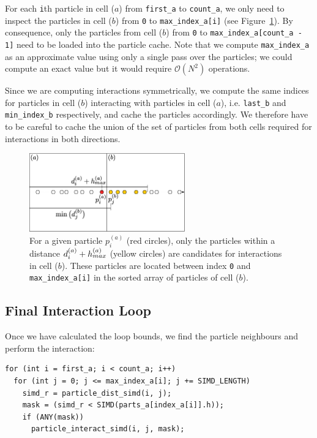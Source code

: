 \documentclass{IOS-Book-Article}
\begin{document}
\noindent For each {\tt i}th particle in cell ($a$) from {\tt first\_a} to {\tt count\_a}, we only need to inspect the particles in cell ($b$) from {\tt 0} to {\tt max\_index\_a[i]} (see Figure~\ref{fig:read_cache_subset}). By consequence, only the particles from cell ($b$) from {\tt 0} to {\tt max\_index\_a[count\_a - 1]} need to be loaded into the particle cache. Note that we compute {\tt max\_index\_a} as an approximate value using only a single pass over the particles; we could compute an exact value but it would require $\mathcal{O}(N^2)$ operations.

Since we are computing interactions symmetrically, we compute the same indices for particles in cell ($b$) interacting with particles in cell ($a$), i.e. {\tt last\_b} and {\tt min\_index\_b} respectively, and cache the particles accordingly. We therefore have to be careful to cache the union of the set of particles from both cells required for interactions in both directions.

\begin{figure}
  \centering
  \includegraphics[width=0.6\textwidth]{Figures/read_cache_subset.eps}
  \caption{For a given particle $p_i^{(a)}$ (red circles), only the particles within a distance $d_i^{(a)}+h_{\rm max}^{(a)}$ (yellow circles) are candidates for interactions in cell ($b$). These particles are located between index {\tt 0} and {\tt max\_index\_a[i]} in the sorted array of particles of cell ($b$).}
   \label{fig:read_cache_subset}
\end{figure}

\subsection{Final Interaction Loop}
\label{sec:final_loop}

Once we have calculated the loop bounds, we find the particle neighbours and perform the interaction:

\begin{lstlisting}
for (int i = first_a; i < count_a; i++)
  for (int j = 0; j <= max_index_a[i]; j += SIMD_LENGTH)
    simd_r = particle_dist_simd(i, j);
    mask = (simd_r < SIMD(parts_a[index_a[i]].h));
    if (ANY(mask))
      particle_interact_simd(i, j, mask);
\end{lstlisting}
\end{document}
